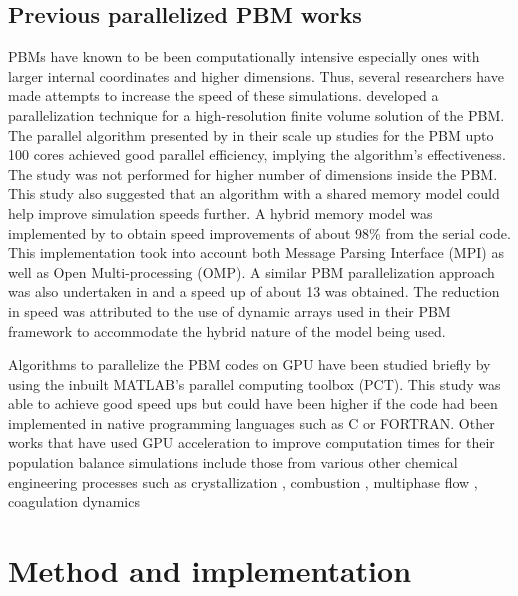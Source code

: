 \documentclass[preprint,10pt,authoryear,review]{elsarticle}
\begin{document}
\begin{linenumbers}
\subsection{Previous parallelized PBM works}
PBMs have known to be been computationally intensive especially ones with larger internal 
coordinates and higher dimensions. Thus, several researchers have made attempts to increase 
the speed of these simulations. \cite{Gunawan2008} developed a parallelization technique 
for a high-resolution finite volume solution of the PBM. The parallel algorithm presented by 
\cite{Gunawan2008} in their scale up studies for the PBM upto 100 cores achieved good 
parallel efficiency, implying the algorithm's effectiveness. The study was not performed for 
higher number of dimensions inside the PBM. This study also suggested that an algorithm 
with a shared memory model could help improve simulation speeds further. A hybrid memory model 
was implemented by \cite{Bettencourt2017} to obtain speed improvements of about 98\% from the 
serial code. This implementation took into account both Message Parsing Interface (MPI) as well 
as Open Multi-processing (OMP). A similar PBM parallelization approach was also undertaken in 
\citep{Sampat2018} and a speed up of about 13 was obtained. The reduction in speed was attributed 
to the use of dynamic arrays used in their PBM framework to accommodate the hybrid nature of the 
model being used. 

Algorithms to parallelize the PBM codes on GPU have been studied briefly by \cite{Prakash2013b} 
using the inbuilt MATLAB's parallel computing toolbox (PCT). This study was able to achieve 
good speed ups but could have been higher if the code had been implemented in native programming 
languages such as C or FORTRAN. Other works that have used GPU acceleration to improve computation 
times for their population balance simulations include those from various other chemical engineering 
processes such as crystallization \citep{Szilagy2016} , combustion \citep{Shi2012} , multiphase flow 
\citep{santos2013} , coagulation dynamics \citep{Xu2015}


\section{Method and implementation}
\label{secMethods}

\end{linenumbers}
\end{document}
